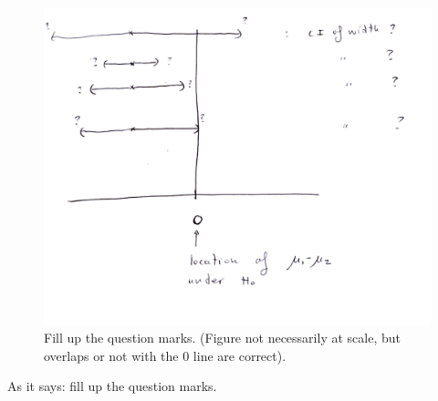 \documentclass[a4paper,11pt]{article}\usepackage[]{graphicx}\usepackage[]{xcolor}
\numberwithin{exercise}{section}
\begin{document}
\begin{figure}[h!]
 \begin{center}
 \includegraphics[width=0.80\paperwidth,keepaspectratio]{cittest.pdf}
 \caption{\label{cittest} Fill up the question marks. (Figure not necessarily at scale, but overlaps or not with the 0 line are correct).}
 \end{center}
 \end{figure}

As it says: fill up the question marks.
\end{document}
